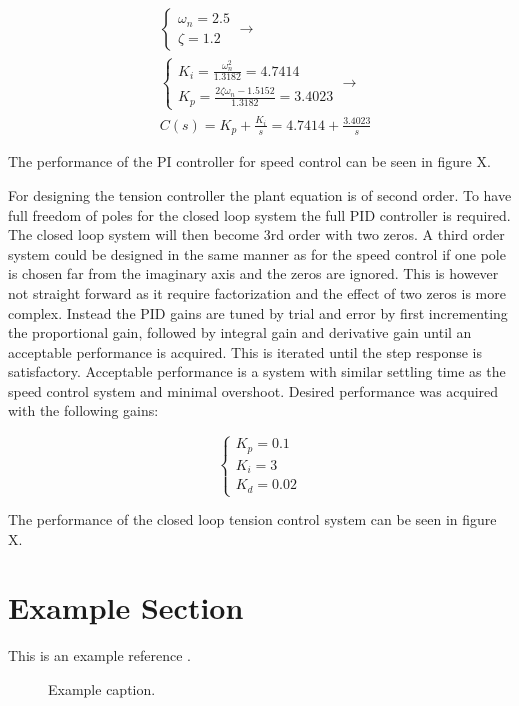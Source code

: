 \documentclass[a4paper, titlepage]{article}
\begin{document}
\begin{equation}
\begin{split}
&\begin{cases}
\omega_n = 2.5 \\ \zeta = 1.2
\end{cases} \rightarrow \\
&\begin{cases}
K_i = \frac{\omega_n^2}{1.3182} = 4.7414 \\
K_p = \frac{2\zeta\omega_n - 1.5152}{1.3182} = 3.4023
\end{cases} \rightarrow \\
&C(s) = K_p + \frac{K_i}{s} = 4.7414 + \frac{3.4023}{s}
\end{split}
\end{equation}

The performance of the PI controller for speed control can be seen in figure X.

For designing the tension controller the plant equation is of second order.
To have full freedom of poles for the closed loop system the full PID controller is required.
The closed loop system will then become 3rd order with two zeros.
A third order system could be designed in the same manner as for the speed control if one pole is chosen far from the imaginary axis and the zeros are ignored.
This is however not straight forward as it require factorization and the effect of two zeros is more complex.
Instead the PID gains are tuned by trial and error by first incrementing the proportional gain, followed by integral gain and derivative gain until an acceptable performance is acquired.
This is iterated until the step response is satisfactory.
Acceptable performance is a system with similar settling time as the speed control system and minimal overshoot.
Desired performance was acquired with the following gains:

\begin{equation}
\begin{cases}
K_p = 0.1 \\ K_i = 3 \\ K_d = 0.02
\end{cases}
\end{equation}

The performance of the closed loop tension control system can be seen in figure X.

\clearpage


\clearpage
\appendix

\section{Example Section}
This is an example reference \citep{glad00}.

\begin{figure}[h!]
\center
\caption{Example caption.}
\label{fig:exampleLable}
\end{figure}


\end{document}
